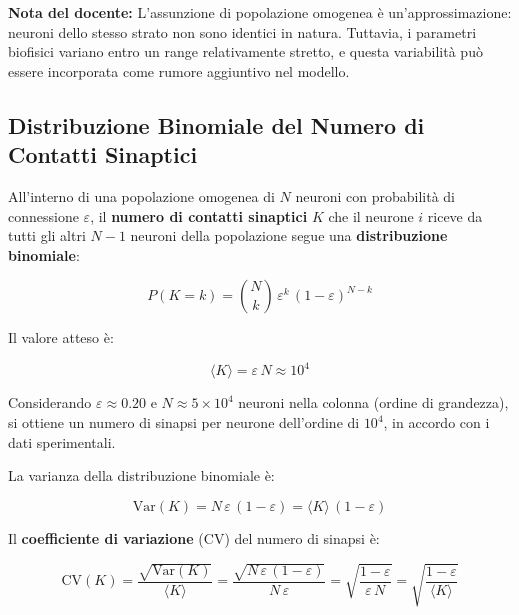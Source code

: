 \begin{tcolorbox}[colback=gray!5, colframe=gray!40, arc=2mm, boxrule=0.5pt]
\textbf{Nota del docente:} L'assunzione di popolazione omogenea è un'approssimazione: neuroni dello stesso strato non sono identici in natura. Tuttavia, i parametri biofisici variano entro un range relativamente stretto, e questa variabilità può essere incorporata come rumore aggiuntivo nel modello.
\end{tcolorbox}


\subsection{Distribuzione Binomiale del Numero di Contatti Sinaptici}


All'interno di una popolazione omogenea di $N$ neuroni con probabilità di connessione $\varepsilon$, il \textbf{numero di contatti sinaptici} $K$ che il neurone $i$ riceve da tutti gli altri $N-1$ neuroni della popolazione segue una \textbf{distribuzione binomiale}:

\begin{equation}
\boxed{P(K = k) = \binom{N}{k}\,\varepsilon^k\,(1-\varepsilon)^{N-k}}
\end{equation}


Il valore atteso è:

\begin{equation}
\langle K \rangle = \varepsilon\, N \approx 10^4
\end{equation}

Considerando $\varepsilon \approx 0.20$ e $N \approx 5 \times 10^4$ neuroni nella colonna (ordine di grandezza), si ottiene un numero di sinapsi per neurone dell'ordine di $10^4$, in accordo con i dati sperimentali.


La varianza della distribuzione binomiale è:

\begin{equation}
\text{Var}(K) = N\,\varepsilon\,(1-\varepsilon) = \langle K \rangle\,(1-\varepsilon)
\end{equation}

Il \textbf{coefficiente di variazione} (CV) del numero di sinapsi è:

\begin{equation}
\text{CV}(K) = \frac{\sqrt{\text{Var}(K)}}{\langle K \rangle} = \frac{\sqrt{N\,\varepsilon\,(1-\varepsilon)}}{N\,\varepsilon} = \sqrt{\frac{1-\varepsilon}{\varepsilon\,N}} = \sqrt{\frac{1-\varepsilon}{\langle K \rangle}}
\end{equation}

